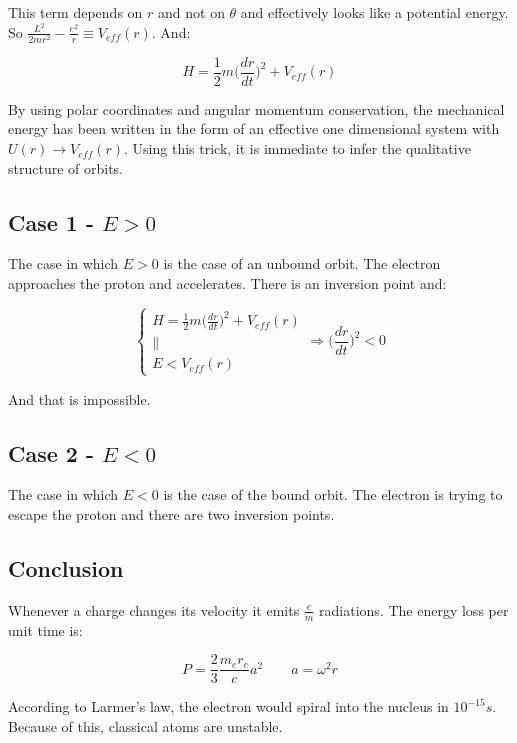  This term depends on $r$ and not on $\theta$ and effectively looks like a potential energy.
  So $\frac{L^2}{2mr^2}-\frac{e^2}{r}\equiv V_{eff}(r)$.
  And:

  $$H = \frac{1}{2}m\biggl(\frac{d{r}}{d{t}}\biggr)^2+V_{eff}(r)$$

  By using polar coordinates and angular momentum conservation, the mechanical energy has been written in the form of an effective one dimensional system with $U(r) \rightarrow V_{eff}(r)$.
  Using this trick, it is immediate to infer the qualitative structure of orbits.

  \subsection{Case 1 - $E>0$}
  The case in which $E>0$ is the case of an unbound orbit.
  The electron approaches the proton and accelerates.
  There is an inversion point and:

  $$\begin{cases} H = \frac{1}{2}m\biggl(\frac{d{r}}{d{t}}\biggr)^2+V_{eff}(r)\\
    \parallel\\
    E<V_{eff}(r)
  \end{cases}
  \Rightarrow \biggl(\frac{d{r}}{d{t}}\biggr)^2< 0$$

  And that is impossible.

  \subsection{Case 2 - $E<0$}
  The case in which $E<0$ is the case of the bound orbit.
  The electron is trying to escape the proton and there are two inversion points.

  \subsection{Conclusion}
  Whenever a charge changes its velocity it emits $\frac{e}{m}$ radiations.
  The energy loss per unit time is:

  $$P = \frac{2}{3}\frac{m_er_e}{c}a^2\qquad a = \omega^2 r$$

  According to Larmer's law, the electron would spiral into the nucleus in $10^{-15}s$.
  Because of this, classical atoms are unstable.
